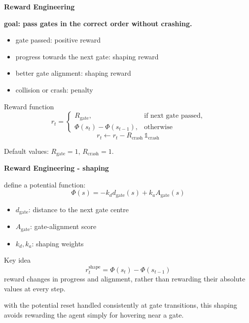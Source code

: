 \documentclass[xcolor=dvipsnames]{beamer}
\begin{document}
\begin{frame}{\bf Reward Engineering}

  \textbf{goal: pass gates in the correct order without crashing.}

  \begin{itemize}
    \item gate passed: positive reward
    \item progress towards the next gate: shaping reward
    \item better gate alignment: shaping reward
    \item collision or crash: penalty
  \end{itemize}

  \begin{block}{Reward function}
    \[
      r_t =
      \begin{cases}
        R_{\mathrm{gate}}, & \text{if next gate passed},\\
        \Phi(s_t)-\Phi(s_{t-1}), & \text{otherwise}
      \end{cases}
    \]
    \[
      r_t \leftarrow r_t -
      R_{\mathrm{crash}}\,\mathbb{1}_{\mathrm{crash}}
    \]
  \end{block}

  \small
  Default values:
  $R_{\mathrm{gate}}=1$,
  $R_{\mathrm{crash}}=1$.

\end{frame}


\begin{frame}{\bf Reward Engineering - shaping}

  define a potential function:
  \[
    \Phi(s) =
    -k_d d_{\mathrm{gate}}(s)
    + k_a A_{\mathrm{gate}}(s)
  \]

  \begin{itemize}
    \item $d_{\mathrm{gate}}$: distance to the next gate centre
    \item $A_{\mathrm{gate}}$: gate-alignment score
    \item $k_d,k_a$: shaping weights
  \end{itemize}

  \vspace{0.2cm}
  \begin{block}{Key idea}
    \[
      r_t^{\mathrm{shape}} = \Phi(s_t)-\Phi(s_{t-1})
    \]
    reward changes in progress and alignment, rather than
    rewarding their absolute values at every step.
  \end{block}

  \small
  with the potential reset handled consistently at gate
  transitions, this shaping avoids rewarding the agent
  simply for hovering near a gate.

\end{frame}
\end{document}

